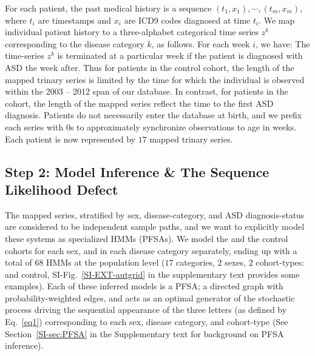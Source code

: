 \documentclass[3p,super,numbers,sort&compress,preprint,10pt]{elsarticle}
\begin{document}
For each patient, the past  medical history is a sequence $(t_1,x_1),\cdots,(t_m,x_m)$, where $t_i$ are timestamps and $x_i$ are ICD9 codes diagnosed at time $t_i$.  We map individual patient history to a three-alphabet categorical time series $z^k$ corresponding to the disease category $k$,  as follows. For each week $i$, we have: 
\noindent
                The time-series $z^k$ is terminated at a particular week if the patient is diagnosed with ASD the week after. Thus for patients in the control cohort, the length of the mapped trinary series is limited by the time for which the individual is observed within the  2003 -- 2012 span of our database. In contrast, for patients in  the \treatment cohort, the length of the mapped series reflect the time to the first ASD diagnosis. Patients do not necessarily enter the database at birth, and we prefix each series with 0s to  approximately synchronize observations to age in weeks. Each patient is now represented by $17$ mapped trinary series.
\subsection*{Step 2: Model Inference \& The Sequence Likelihood Defect}
The mapped series, stratified by  sex, disease-category, and ASD diagnosis-status are considered to be independent sample paths, and we want to explicitly model these systems as specialized HMMs (PFSAs). We model the \treatment and the control cohorts for each sex, and in  each disease category separately, ending up with a total of $68$ HMMs at the population level ($17$ categories, $2$ sexes, $2$ cohort-types: \treatment and control, SI-Fig.~\ref{SI-EXT-autgrid} in the supplementary text provides some examples). Each of these inferred models is  a PFSA;  a directed graph with probability-weighted edges, and acts as an optimal generator of the  stochastic process driving the  sequential appearance of the three letters (as defined by Eq.~\eqref{eq1})  corresponding to each sex, disease category, and cohort-type (See Section~\ref{SI-sec:PFSA} in the Supplementary text for  background on PFSA inference). 
\end{document}
